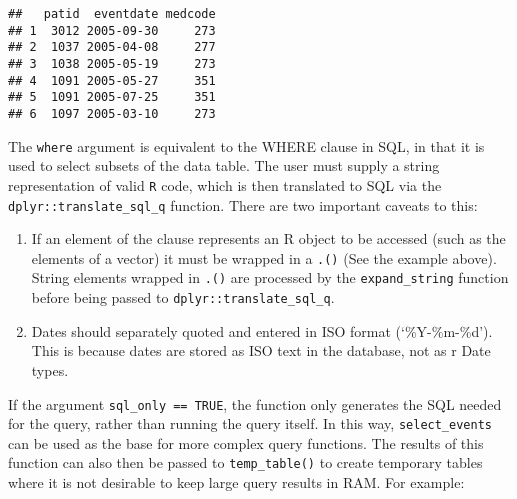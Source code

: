 \documentclass[]{article}
\newenvironment{Shaded}{\begin{snugshade}}{\end{snugshade}}
\newcommand{\KeywordTok}[1]{\textcolor[rgb]{0.13,0.29,0.53}{\textbf{{#1}}}}
\newcommand{\DataTypeTok}[1]{\textcolor[rgb]{0.13,0.29,0.53}{{#1}}}
\newcommand{\StringTok}[1]{\textcolor[rgb]{0.31,0.60,0.02}{{#1}}}
\newcommand{\NormalTok}[1]{{#1}}
\begin{document}
\begin{Shaded}
\end{Shaded}

\begin{verbatim}
##   patid  eventdate medcode
## 1  3012 2005-09-30     273
## 2  1037 2005-04-08     277
## 3  1038 2005-05-19     273
## 4  1091 2005-05-27     351
## 5  1091 2005-07-25     351
## 6  1097 2005-03-10     273
\end{verbatim}

The \texttt{where} argument is equivalent to the WHERE clause in SQL, in
that it is used to select subsets of the data table. The user must
supply a string representation of valid \texttt{R} code, which is then
translated to SQL via the \texttt{dplyr::translate\_sql\_q} function.
There are two important caveats to this:

\begin{enumerate}
\def\labelenumi{\arabic{enumi}.}
\itemsep1pt\parskip0pt
\item
  If an element of the clause represents an R object to be accessed
  (such as the elements of a vector) it must be wrapped in a
  \texttt{.()} (See the example above). String elements wrapped in
  \texttt{.()} are processed by the \texttt{expand\_string} function
  before being passed to \texttt{dplyr::translate\_sql\_q}.
\item
  Dates should separately quoted and entered in ISO format
  (`\%Y-\%m-\%d'). This is because dates are stored as ISO text in the
  database, not as r Date types.
\end{enumerate}

If the argument \texttt{sql\_only == TRUE}, the function only generates
the SQL needed for the query, rather than running the query itself. In
this way, \texttt{select\_events} can be used as the base for more
complex query functions. The results of this function can also then be
passed to \texttt{temp\_table()} to create temporary tables where it is
not desirable to keep large query results in RAM. For example:
\end{document}
